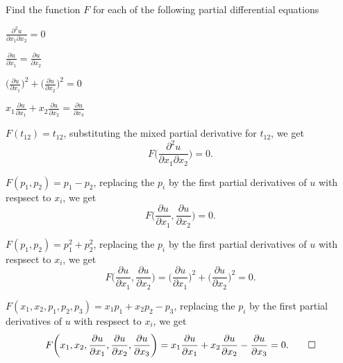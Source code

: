 Find the function $F$ for each of the following partial differential
equations
\begin{teilaufgaben}
\item $\displaystyle\frac{\partial^2 u}{\partial x_1\partial x_2}=0$
\item $\displaystyle\frac{\partial u}{\partial x_1}=\frac{\partial u}{\partial x_2}$
\item $\displaystyle
\biggl(\frac{\partial u}{\partial x_1}\biggr)^2+
\biggl(\frac{\partial u}{\partial x_2}\biggr)^2=0$
\item $\displaystyle
x_1\frac{\partial u}{\partial x_1}+
x_2\frac{\partial u}{\partial x_2}=\frac{\partial u}{\partial x_3}$
\end{teilaufgaben}

\begin{loesung}
\begin{teilaufgaben}
\item
$F(t_{12})=t_{12}$,
substituting  the mixed partial derivative for
$t_{12}$, we get
\[
F\biggl(\frac{\partial^2 u}{\partial x_1\partial x_2}\biggr)=0.
\]
\item
$F(p_1,p_2)=p_1-p_2$,
replacing the $p_i$ by the first partial derivatives of $u$ with respsect
to $x_i$, we get
\[
F\biggl(\frac{\partial u}{\partial x_1},\frac{\partial u}{\partial x_2}\biggr)=0.
\]
\item
$F(p_1,p_2)=p_1^2+p_2^2$,
replacing the $p_i$ by the first partial derivatives of $u$ with respsect
to $x_i$, we get
\[
F\biggl(
\frac{\partial u}{\partial x_1},
\frac{\partial u}{\partial x_2}
\biggr)
=
\biggl(\frac{\partial u}{\partial x_1}\biggr)^2+
\biggl(\frac{\partial u}{\partial x_2}\biggr)^2
=
0.
\]
\item
$F(x_1,x_2,p_1,p_2,p_3)=x_1p_1+x_2p_2-p_3$,
replacing the $p_i$ by the first partial derivatives of $u$ with respsect
to $x_i$, we get
\[
F\biggl(x_1,x_2,
\frac{\partial u}{\partial x_1},
\frac{\partial u}{\partial x_2},
\frac{\partial u}{\partial x_3}\biggr)=
x_1\frac{\partial u}{\partial x_1}+
x_2\frac{\partial u}{\partial x_2}-\frac{\partial u}{\partial x_3}=0.
\qedhere
\]
\end{teilaufgaben}
\end{loesung}
